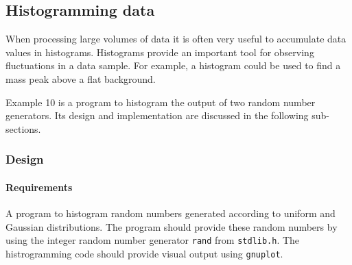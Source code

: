 \documentclass[11pt]{scrartcl}
\begin{document}
\subsection{Histogramming data}

When processing large volumes of data it is often very useful to
accumulate data values in histograms.  Histograms provide an important
tool for observing fluctuations in a data sample.  For example, a
histogram could be used to find a mass peak above a flat background.

Example 10 is a program to histogram the output of two random number
generators.  Its design and implementation are discussed in the
following sub-sections.

\subsubsection*{Design}

\paragraph{Requirements}
A program to histogram random numbers generated according to uniform
and Gaussian distributions.  The program should provide these random
numbers by using the integer random number generator \texttt{rand}
from \texttt{stdlib.h}.  The histrogramming code should provide visual
output using \texttt{gnuplot}.
\end{document}
